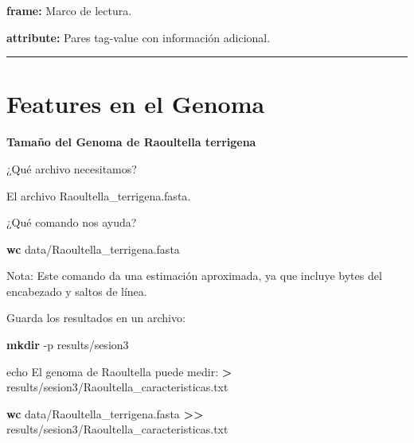 \documentclass[
]{book}
\newenvironment{Shaded}{\begin{snugshade}}{\end{snugshade}}
\newcommand{\AttributeTok}[1]{\textcolor[rgb]{0.13,0.29,0.53}{#1}}
\newcommand{\BuiltInTok}[1]{#1}
\newcommand{\FunctionTok}[1]{\textcolor[rgb]{0.13,0.29,0.53}{\textbf{#1}}}
\newcommand{\NormalTok}[1]{#1}
\newcommand{\OperatorTok}[1]{\textcolor[rgb]{0.81,0.36,0.00}{\textbf{#1}}}
\newcommand{\StringTok}[1]{\textcolor[rgb]{0.31,0.60,0.02}{#1}}
\begin{document}
\textbf{frame:} Marco de lectura.

\textbf{attribute:} Pares tag-value con información adicional.

\begin{center}\rule{0.5\linewidth}{0.5pt}\end{center}

\section{Features en el Genoma}\label{features-en-el-genoma}

\textbf{Tamaño del Genoma de Raoultella terrigena}

¿Qué archivo necesitamos?

El archivo Raoultella\_terrigena.fasta.

¿Qué comando nos ayuda?

\begin{Shaded}
\begin{Highlighting}[]
\FunctionTok{wc}\NormalTok{ data/Raoultella\_terrigena.fasta}
\end{Highlighting}
\end{Shaded}

Nota: Este comando da una estimación aproximada, ya que incluye bytes del encabezado y saltos de línea.

Guarda los resultados en un archivo:

\begin{Shaded}
\begin{Highlighting}[]
\FunctionTok{mkdir} \AttributeTok{{-}p}\NormalTok{ results/sesion3}
\end{Highlighting}
\end{Shaded}

\begin{Shaded}
\begin{Highlighting}[]
\BuiltInTok{echo} \StringTok{\textquotesingle{}El genoma de Raoultella puede medir:\textquotesingle{}} \OperatorTok{\textgreater{}}\NormalTok{ results/sesion3/Raoultella\_caracteristicas.txt}
\end{Highlighting}
\end{Shaded}

\begin{Shaded}
\begin{Highlighting}[]
\FunctionTok{wc}\NormalTok{ data/Raoultella\_terrigena.fasta }\OperatorTok{\textgreater{}\textgreater{}}\NormalTok{ results/sesion3/Raoultella\_caracteristicas.txt}
\end{Highlighting}
\end{Shaded}
\end{document}

